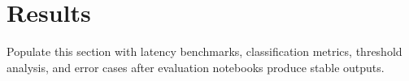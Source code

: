 \section{Results}
Populate this section with latency benchmarks, classification metrics, threshold analysis, and error cases after evaluation notebooks produce stable outputs.
